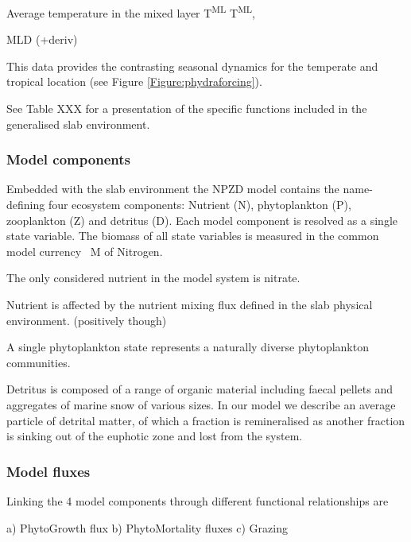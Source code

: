 \documentclass[template.tex]{subfiles}
\begin{document}

Average temperature in the mixed layer \unit{T^{ML}}
\unit{T^{ML}},

MLD (+deriv)

This data provides the contrasting seasonal dynamics for the temperate and tropical location (see Figure \ref{Figure:phydraforcing}).

See Table XXX for a presentation of the specific functions included in the generalised slab environment. 

\subsubsection{Model components}
Embedded with the slab environment the NPZD model contains the name-defining four ecosystem components: Nutrient (N), phytoplankton (P), zooplankton (Z) and detritus (D). 
Each model component is resolved as a single state variable. The biomass of all state variables is measured in the common model currency \unit{\mu M} of Nitrogen.

The only considered nutrient in the model system is nitrate. 

Nutrient is affected by the nutrient mixing flux defined in the slab physical environment. (positively though)



A single phytoplankton state represents a naturally diverse phytoplankton communities. 



Detritus is composed of a range of organic material including faecal pellets and aggregates of marine snow of various sizes. In our model we describe an average particle of detrital matter, of which a fraction is remineralised as another fraction is sinking out of the euphotic zone and lost from the system. 



\subsubsection{Model fluxes} \label{Section:SlabNPZD_Fluxes}
Linking the 4 model components through different functional relationships are 

a) PhytoGrowth flux
b) PhytoMortality fluxes
c) Grazing
\end{document}
